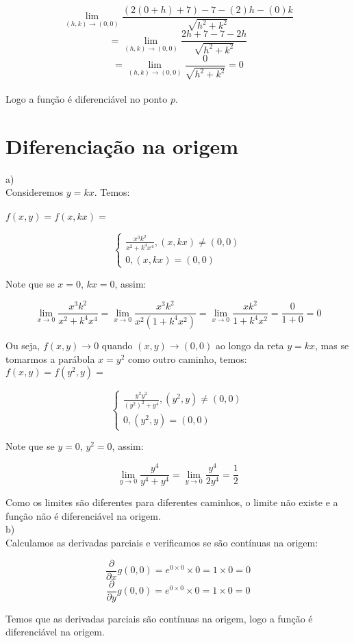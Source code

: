 \documentclass[11pt]{article}
\begin{document}
$$\lim_{(h, k) \rightarrow (0, 0)} \frac{(2(0+h) + 7) - 7 - (2)h - (0)k}{\sqrt{h^2 + k^2}}$$
$$ = \lim_{(h, k) \rightarrow (0, 0)} \frac{2h + 7 - 7 - 2h}{\sqrt{h^2 + k^2}}$$
$$ = \lim_{(h, k) \rightarrow (0, 0)} \frac{0}{\sqrt{h^2 + k^2}} = 0$$\\

Logo a função é diferenciável no ponto $p$.\\

\section{Diferenciação na origem}

a)\\
Consideremos $y = kx$. Temos:\\
\\
$f(x, y) = f(x, kx) = $

\[ \begin{cases}
	\frac{x^3k^2}{x^2 + k^4x^4}, (x, kx) \neq (0, 0)\\
	0, (x, kx) = (0, 0)
   \end{cases}
\]

Note que se $x = 0$, $kx = 0$, assim:

$$\lim_{x \rightarrow 0} \frac{x^3k^2}{x^2 + k^4x^4} = \lim_{x \rightarrow 0} \frac{x^3k^2}{x^2(1 + k^4x^2)} = \lim_{x \rightarrow 0} \frac{xk^2}{1 + k^4x^2} = \frac{0}{1 + 0} = 0$$

Ou seja, $f(x, y) \rightarrow 0$ quando $(x, y) \rightarrow (0, 0)$ ao longo da reta $y = kx$, mas se tomarmos a parábola $x = y^2$ como outro caminho, temos:\\

$f(x, y) = f(y^2, y) = $

\[ \begin{cases}
	\frac{y^2y^2}{(y^2)^2 + y^4}, (y^2, y) \neq (0, 0)\\
	0, (y^2, y) = (0, 0)
   \end{cases}
\]

Note que se $y = 0$, $y^2 = 0$, assim:

$$\lim_{y \rightarrow 0} \frac{y^4}{y^4 + y^4} = \lim_{y \rightarrow 0} \frac{y^4}{2y^4} = \frac{1}{2}$$

Como os limites são diferentes para diferentes caminhos, o limite não existe e a função não é diferenciável na origem.\\

b)\\
Calculamos as derivadas parciais e verificamos se são contínuas na origem:

$$\frac{\partial}{\partial x} g(0, 0) = e^{0 \times 0} \times 0 = 1 \times 0 = 0$$
$$\frac{\partial}{\partial y} g(0, 0) = e^{0 \times 0} \times 0 = 1 \times 0 = 0$$

Temos que as derivadas parciais são contínuas na origem, logo a função é diferenciável na origem.
\end{document}
